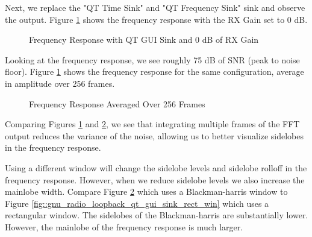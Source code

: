 \documentclass{article}
\begin{document}
Next, we replace the "QT Time Sink" and "QT Frequency Sink" sink and observe the output. Figure \ref{fig::gnu_radio_loopback_qt_gui_sink} shows the frequency response with the RX Gain set to 0 dB.

\begin{figure}[H]
	\centerline{}
	\caption{Frequency Response with QT GUI Sink and 0 dB of RX Gain}
	\label{fig::gnu_radio_loopback_qt_gui_sink}
\end{figure}

Looking at the frequency response, we see roughly 75 dB of SNR (peak to noise floor). Figure \ref{fig::gnu_radio_loopback_qt_gui_sink} shows the frequency response for the same configuration, average in amplitude over 256 frames.

\begin{figure}[H]
	\centerline{}
	\caption{Frequency Response Averaged Over 256 Frames}
	\label{fig::gnu_radio_loopback_qt_gui_sink_avg_256}
\end{figure}

Comparing Figures \ref{fig::gnu_radio_loopback_qt_gui_sink} and \ref{fig::gnu_radio_loopback_qt_gui_sink_avg_256}, we see that integrating multiple frames of the FFT output reduces the variance of the noise, allowing us to better visualize sidelobes in the frequency response. 

Using a different window will change the sidelobe levels and sidelobe rolloff in the frequency response. However, when we reduce sidelobe levels we also increase the mainlobe width. Compare Figure \ref{fig::gnu_radio_loopback_qt_gui_sink_avg_256} which uses a Blackman-harris window to Figure \ref{fig::gnu_radio_loopback_qt_gui_sink_rect_win} which uses a rectangular window. The sidelobes of the Blackman-harris are substantially lower. However, the mainlobe of the frequency response is much larger.
\end{document}

